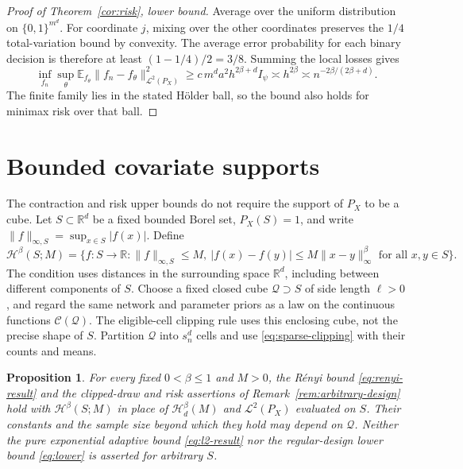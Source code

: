 \documentclass[11pt,a4paper]{article}
\newtheorem{proposition}{Proposition}
\theoremstyle{remark}
\newcommand{\Hcal}{\mathcal H}
\newcommand{\Lcal}{\mathcal L}
\newcommand{\Ccal}{\mathcal C}
\newcommand{\E}{\mathbb E}
\newcommand{\norm}[1]{\lVert#1\rVert}
\begin{document}
\begin{proof}[Proof of Theorem~\ref{cor:risk}, lower bound]
Average over the uniform distribution on $\{0,1\}^{m^d}$.
For coordinate $j$, mixing over the other coordinates preserves the
$1/4$ total-variation bound by convexity. The average error
probability for each binary decision is therefore at least
$(1-1/4)/2=3/8$. Summing the local losses gives
\[
\inf_{f_n}\sup_{\theta}
\E_{f_\theta}\norm{f_n-f_\theta}_{\Lcal^2(P_X)}^2
\geq c\,m^da^2h^{2\beta+d}I_\psi
\asymp h^{2\beta}\asymp n^{-2\beta/(2\beta+d)}.
\]
The finite family lies in the stated H\"older ball, so the bound also
holds for minimax risk over that ball.
\end{proof}
\endgroup

\section{Bounded covariate supports}\label{app:bounded-support}

The contraction and risk upper bounds do not require the support
of $P_X$ to be a cube. Let $S\subset\mathbb R^d$ be a fixed bounded Borel set,
$P_X(S)=1$, and write $\norm f_{\infty,S}=\sup_{x\in S}|f(x)|$.
Define
\[
\Hcal^\beta(S;M)=\{f:S\to\mathbb R:
\norm f_{\infty,S}\leq M,\
|f(x)-f(y)|\leq M\norm{x-y}_\infty^\beta
\text{ for all }x,y\in S\}.
\]
The condition uses distances in the surrounding space $\mathbb R^d$,
including between different components of $S$. Choose a fixed closed cube $\mathcal Q\supset S$ of side length
$\ell>0$, and regard the {same network and parameter priors as a law}
on the continuous functions $\Ccal(\mathcal Q)$. The eligible-cell clipping rule uses this enclosing cube,
not the precise shape of $S$. Partition $\mathcal Q$ into $s_n^d$ cells
and use \eqref{eq:sparse-clipping} with their counts and means.

\begin{proposition}\label{prop:bounded-support}
For every fixed $0<\beta\leq1$ and $M>0$, the R\'enyi bound
\eqref{eq:renyi-result} and the clipped-draw and risk assertions of
Remark~\ref{rem:arbitrary-design} hold with $\Hcal^\beta(S;M)$
in place of $\Hcal_d^\beta(M)$ and $\Lcal^2(P_X)$ evaluated on $S$.
Their constants and the sample size beyond which they hold may
depend on $\mathcal Q$. Neither the pure
exponential adaptive bound \eqref{eq:l2-result} nor the regular-design
lower bound \eqref{eq:lower} is asserted for arbitrary $S$.
\end{proposition}
\end{document}
